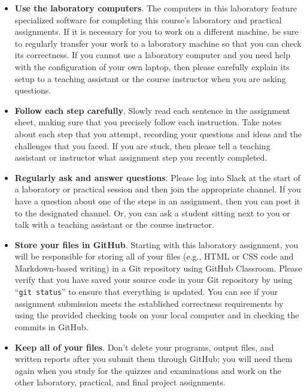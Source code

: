 \documentclass[11pt]{article}
\newcommand{\command}[1]{``\lstinline{#1}''}
\begin{document}
\begin{itemize}
  \setlength{\itemsep}{0pt}

\item {\bf Use the laboratory computers}. The computers in this laboratory feature specialized software for completing
  this course's laboratory and practical assignments. If it is necessary for you to work on a different machine, be sure
  to regularly transfer your work to a laboratory machine so that you can check its correctness. If you cannot use a
  laboratory computer and you need help with the configuration of your own laptop, then please carefully explain its
  setup to a teaching assistant or the course instructor when you are asking questions.

\item {\bf Follow each step carefully}. Slowly read each sentence in the assignment sheet, making sure that you
  precisely follow each instruction. Take notes about each step that you attempt, recording your questions and ideas and
  the challenges that you faced. If you are stuck, then please tell a teaching assistant or instructor what assignment
  step you recently completed.

\item {\bf Regularly ask and answer questions}. Please log into Slack at the start of a laboratory or practical session
  and then join the appropriate channel. If you have a question about one of the steps in an assignment, then you can
  post it to the designated channel. Or, you can ask a student sitting next to you or talk with a teaching assistant or
  the course instructor.

\item {\bf Store your files in GitHub}. Starting with this laboratory
  assignment, you will be responsible for storing all of your files (e.g., HTML
  or CSS code and Markdown-based writing) in a Git repository using GitHub
  Classroom. Please verify that you have saved your source code in your Git
  repository by using \command{git status} to ensure that everything is updated.
  You can see if your assignment submission meets the established correctness
  requirements by using the provided checking tools on your local computer and
  in checking the commits in GitHub.

\item {\bf Keep all of your files}. Don't delete your programs, output files, and written reports after you submit them
  through GitHub; you will need them again when you study for the quizzes and examinations and work on the other
  laboratory, practical, and final project assignments.


\end{itemize}
\end{document}
